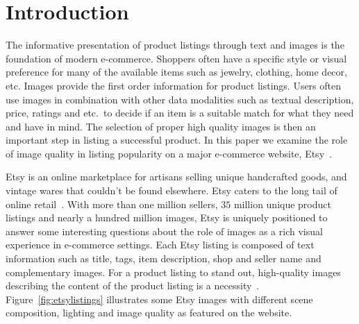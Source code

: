 \documentclass[conference,a4paper]{IEEEtran}
\newcommand{\etc}{etc.~}
\begin{document}
\section{Introduction}
The informative presentation of product listings through text and 
images is the foundation of modern e-commerce. Shoppers often have a 
specific style or visual preference for many of the available items such as jewelry, clothing, home decor, etc. 
Images provide the first order information for product listings. 
Users often use images in combination with other data modalities such as textual description, price, ratings and \etc to decide if an item is a suitable match for what they need and have in mind. The selection of proper high quality images is then an important step in listing a successful product. In this paper we examine the role of image quality in listing popularity on a major e-commerce website, Etsy~.



Etsy is an online marketplace for artisans selling unique handcrafted goods, and vintage wares that
couldn't be found elsewhere. Etsy caters to the long tail of online retail~\cite{Anderson:2006,aryafar2014exploring}. With more than one million sellers, $35$ million unique product listings and nearly a hundred million images, Etsy is uniquely positioned to answer some interesting questions about the role of images as a rich visual experience in e-commerce settings. Each Etsy listing is composed of text information such as title, tags, item description, shop and seller name and complementary images. For a product listing to stand out, high-quality images describing the content of the product listing is a necessity~\cite{wang2011aesthetics,obrador2009role}. Figure~\ref{fig:etsylistings} illustrates some Etsy images with different scene composition, lighting and image quality as featured on the website.
\end{document}
